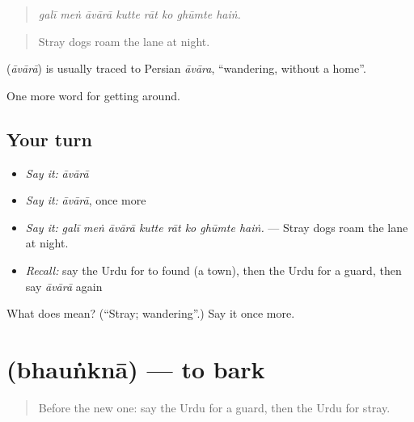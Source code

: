 \begin{quote}
\emph{galī meṅ āvārā kutte rāt ko ghūmte haiṅ.}
\end{quote}

\begin{quote}
Stray dogs roam the lane at night.
\end{quote}

\begin{cousinweb}
\textbf{} (\emph{āvārā}) is usually traced to Persian \emph{āvāra}, \textquotedblleft{}wandering, without a home\textquotedblright{}.
\end{cousinweb}

\begin{grammarlens}[title={What you've built}]
One more word for getting around.
\end{grammarlens}

\subsection*{Your turn}
\begin{itemize}
\raggedright
  \item \emph{Say it:} \emph{āvārā}
  \item \emph{Say it:} \emph{āvārā}, once more
  \item \emph{Say it:} \emph{galī meṅ āvārā kutte rāt ko ghūmte haiṅ.} — Stray dogs roam the lane at night.
  \item \emph{Recall:} say the Urdu for to found (a town), then the Urdu for a guard, then say \emph{āvārā} again
\end{itemize}

\begin{tcolorbox}[breakable,colback=teal!4,colframe=teal!35!black,title={Before you move on}]
What does  mean? (\textquotedblleft{}Stray; wandering\textquotedblright{}.) Say it once more.
\end{tcolorbox}
\section[\texorpdfstring{\ur{بھونکنا} (bhauṅknā)}{بھونکنا (bhauṅknā)}]{ (bhauṅknā) — to bark}

\label{lesson:UR-C414-bhaunkna}



\begin{quote}
Before the new one: say the Urdu for a guard, then the Urdu for stray.
\end{quote}

